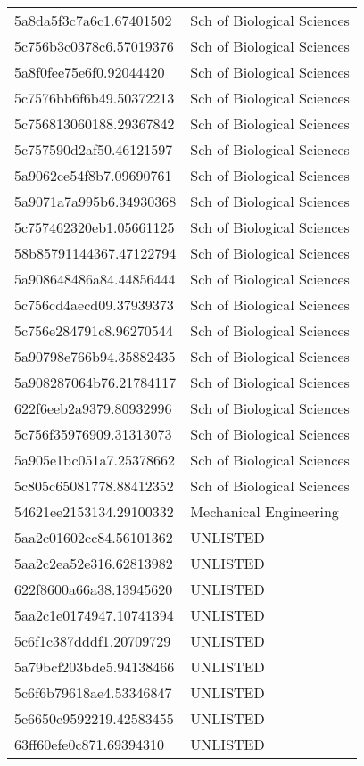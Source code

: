 \begin{tabular}{ll}
5a8da5f3c7a6c1.67401502 & Sch of Biological Sciences \\
5c756b3c0378c6.57019376 & Sch of Biological Sciences \\
5a8f0fee75e6f0.92044420 & Sch of Biological Sciences \\
5c7576bb6f6b49.50372213 & Sch of Biological Sciences \\
5c756813060188.29367842 & Sch of Biological Sciences \\
5c757590d2af50.46121597 & Sch of Biological Sciences \\
5a9062ce54f8b7.09690761 & Sch of Biological Sciences \\
5a9071a7a995b6.34930368 & Sch of Biological Sciences \\
5c757462320eb1.05661125 & Sch of Biological Sciences \\
58b85791144367.47122794 & Sch of Biological Sciences \\
5a908648486a84.44856444 & Sch of Biological Sciences \\
5c756cd4aecd09.37939373 & Sch of Biological Sciences \\
5c756e284791c8.96270544 & Sch of Biological Sciences \\
5a90798e766b94.35882435 & Sch of Biological Sciences \\
5a908287064b76.21784117 & Sch of Biological Sciences \\
622f6eeb2a9379.80932996 & Sch of Biological Sciences \\
5c756f35976909.31313073 & Sch of Biological Sciences \\
5a905e1bc051a7.25378662 & Sch of Biological Sciences \\
5c805c65081778.88412352 & Sch of Biological Sciences \\
54621ee2153134.29100332 & Mechanical Engineering \\
5aa2c01602cc84.56101362 & UNLISTED \\
5aa2c2ea52e316.62813982 & UNLISTED \\
622f8600a66a38.13945620 & UNLISTED \\
5aa2c1e0174947.10741394 & UNLISTED \\
5c6f1c387dddf1.20709729 & UNLISTED \\
5a79bcf203bde5.94138466 & UNLISTED \\
5c6f6b79618ae4.53346847 & UNLISTED \\
5e6650c9592219.42583455 & UNLISTED \\
63ff60efe0c871.69394310 & UNLISTED \\

\end{tabular}
